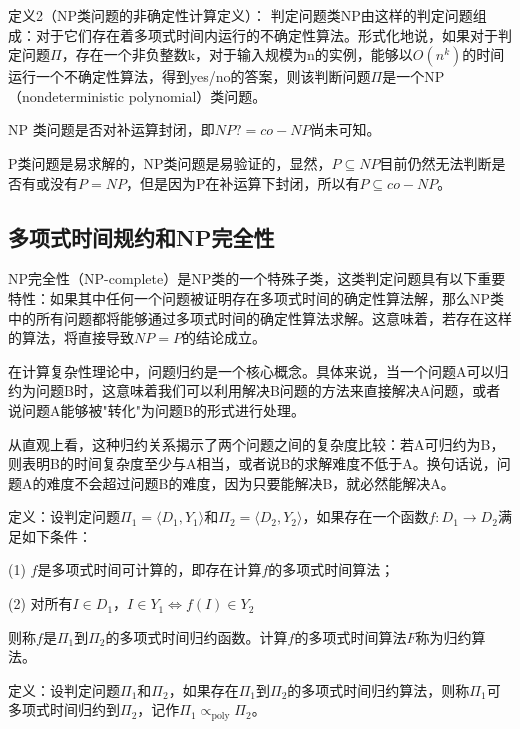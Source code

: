 \documentclass[./../main.tex]{subfiles}
\begin{document}
定义2（NP类问题的非确定性计算定义）：
判定问题类NP由这样的判定问题组成：对于它们存在着多项式时间内运行的不确定性算法。形式化地说，如果对于判定问题$\Pi$，存在一个非负整数k，对于输入规模为n的实例，能够以$O(n^k)$的时间运行一个不确定性算法，得到yes/no的答案，则该判断问题$\Pi$是一个NP（nondeterministic polynomial）类问题。

NP 类问题是否对补运算封闭，即$NP ?= co - NP$尚未可知。


P类问题是易求解的，NP类问题是易验证的，显然，$P\subseteq NP$目前仍然无法判断是否有或没有$P=NP$，但是因为P在补运算下封闭，所以有$P\subseteq co - NP$。

\subsection{多项式时间规约和NP完全性}
NP完全性（NP-complete）是NP类的一个特殊子类，这类判定问题具有以下重要特性：如果其中任何一个问题被证明存在多项式时间的确定性算法解，那么NP类中的所有问题都将能够通过多项式时间的确定性算法求解。这意味着，若存在这样的算法，将直接导致$NP = P$的结论成立。

在计算复杂性理论中，问题归约是一个核心概念。具体来说，当一个问题A可以归约为问题B时，这意味着我们可以利用解决B问题的方法来直接解决A问题，或者说问题A能够被"转化"为问题B的形式进行处理。

从直观上看，这种归约关系揭示了两个问题之间的复杂度比较：若A可归约为B，则表明B的时间复杂度至少与A相当，或者说B的求解难度不低于A。换句话说，问题A的难度不会超过问题B的难度，因为只要能解决B，就必然能解决A。

定义：设判定问题$\Pi_{1}=\langle D_{1},Y_{1}\rangle$和$\Pi_{2}=\langle D_{2},Y_{2}\rangle$，如果存在一个函数$f: D_{1}\to D_{2}$满足如下条件：

(1) $f$是多项式时间可计算的，即存在计算$f$的多项式时间算法；

(2) 对所有$I\in D_{1}$，$I\in Y_{1}\Leftrightarrow f(I)\in Y_{2}$

则称$f$是$\Pi_{1}$到$\Pi_{2}$的多项式时间归约函数。计算$f$的多项式时间算法$F$称为归约算法。

定义：设判定问题$\Pi_{1}$和$\Pi_{2}$，如果存在$\Pi_{1}$到$\Pi_{2}$的多项式时间归约算法，则称$\Pi_{1}$可多项式时间归约到$\Pi_{2}$，记作$\Pi_{1}\propto_{\text{poly}}\Pi_{2}$。
\end{document}
